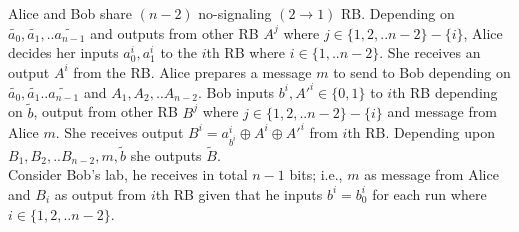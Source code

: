 Alice and Bob share $(n-2)$ no-signaling $(2\rightarrow 1)$ RB. Depending on $\tilde{a_0},\tilde{a_1},..\tilde{a_{n-1}}$ and  outputs from other RB $A^j$ where $j\in\{1,2,..n-2\}-\{i\}$, Alice decides her inputs $a_0^i,a_1^i$ to the $i$th RB where $i\in \{1,..n-2\}$. She receives an output $A^i$ from the RB. Alice prepares a message $m$ to send to Bob depending on $\tilde{a_0},\tilde{a_1}..\tilde{a_{n-1}}$ and $A_1,A_2,..A_{n-2}$. Bob inputs $b^i, A'^i\in \{0,1\}$ to $i$th RB depending on $\tilde{b}$, output from other RB $B^j$ where $j\in\{1,2,..n-2\}-\{i\}$ and message from Alice $m$. She receives output $B^i=a_{b^i}^i\oplus A^i \oplus A'^i$ from $i$th RB.  Depending upon $B_1,B_2,..B_{n-2},m,\tilde{b}$ she outputs $\tilde{B}$. \\

Consider Bob's lab, he receives in total $n-1$ bits; i.e., $m$ as message from Alice and $B_i$ as output from $i$th RB given that he inputs $b^i=b_0^i$ for each run where $i\in\{1,2,..n-2\}$.

